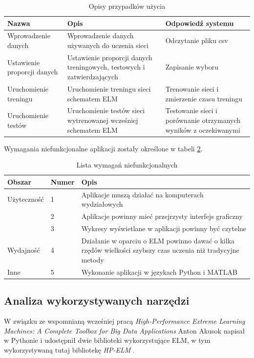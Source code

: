 \documentclass{article}
\begin{document}
\begin{table}[H]
\caption{Opisy przypadków użycia}
\label{use_case_tab}
\begin{tabular}{|p{3.4cm}|p{5cm}|p{4cm}|}
\hline
\textbf{Nazwa} & \textbf{Opis} & \textbf{Odpowiedź systemu} \\
\hline
Wprowadzenie danych & Wprowadzenie danych używanych do uczenia sieci & Odczytanie pliku csv \\ \hline
Ustawienie proporcji danych & Ustawienie proporcji danych treningowych, testowych i zatwierdzających & Zapisanie wyboru \\ \hline
Uruchomienie treningu & Uruchomienie treningu sieci schematem ELM & Trenowanie sieci i zmierzenie czasu treningu \\ \hline
Uruchomienie testów & Uruchomienie testów sieci wytrenowanej wcześniej schematem ELM & Testowanie sieci i porównanie otrzymanych wyników z oczekiwanymi \\
\hline
\end{tabular}
\end{table}

Wymagania niefunkcjonalne aplikacji zostały określone w tabeli \ref{niefunkcjonalne}.
\begin{table}[H]
\caption{Lista wymagań niefunkcjonalnych}
\label{niefunkcjonalne}
\begin{tabular}{|l|l|p{9.4cm}|}
\hline
\textbf{Obszar} & \textbf{Numer} & \textbf{Opis} \\
\hline
Użyteczność & 1 & Aplikacje muszą działać na komputerach wydziałowych \\
 & 2 & Aplikacje powinny mieć przejrzysty interfejs graficzny \\
 & 3 & Wykresy wyświetlane w aplikacji powinny być czytelne \\
\hline
Wydajność & 4 & Działanie w oparciu o ELM powinno dawać o kilka rzędów wielkości szybszy czas uczenia niż tradycyjne metody \\
\hline 
Inne & 5 & Wykonanie aplikacji w językach Python i MATLAB \\
\hline
\end{tabular}
\end{table}
\subsection{Analiza wykorzystywanych narzędzi}
W związku ze wspomnianą wcześniej pracą \textit{High-Performance Extreme Learning Machines: A Complete Toolbox for Big Data Applications} Anton Akusok napisał w Pythonie i udostępnił dwie biblioteki wykorzystujące ELM, w tym wykorzystywaną tutaj bibliotekę \textit{HP-ELM} \cite{hpelm}.
\end{document}

